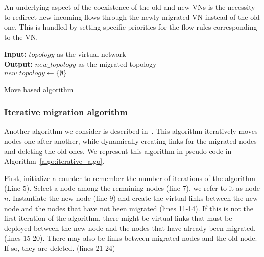 An underlying aspect of the coexistence of the old and new VNs is the necessity to redirect new incoming flows through the newly migrated VN instead of the old one.
This is handled by setting specific priorities for the flow rules corresponding to the VN.


\begin{algorithm}[ht]
\textbf{Input: }$topology$ as the virtual network\\
\textbf{Output: } $new\_topology$ as the migrated topology\\
$new\_topology \gets \{\emptyset\}$\\
\caption{Move based algorithm}
\label{algo:move_algo}
\end{algorithm}


\subsubsection{Iterative migration algorithm}
Another algorithm we consider is described in~\cite{vnm-lo2013}.
This algorithm iteratively moves nodes one after another, while dynamically creating links for the migrated nodes and deleting the old ones.
We represent this algorithm in pseudo-code in Algorithm~\ref{algo:iterative_algo}.

First, initialize a counter to remember the number of iterations of the algorithm (Line 5).
Select a node among the remaining nodes (line 7), we refer to it as node $n$. Instantiate the new node (line 9) and create the virtual links between the new node and the nodes that have not been migrated (lines 11-14).
If this is not the first iteration of the algorithm, there might be virtual links that must be deployed between the new node and the nodes that have already been migrated. (lines 15-20).
There may also be links between migrated nodes and the old node.
If so, they are deleted. (lines 21-24)



